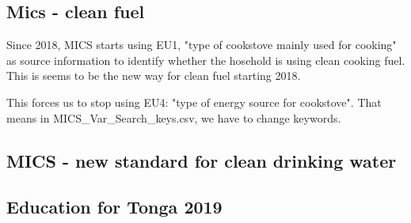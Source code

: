 \documentclass[12pt]{article}
\begin{document}
\subsection{Mics - clean fuel}

Since 2018, MICS starts using EU1, "type of cookstove mainly used for cooking" as source information to identify whether the hosehold is using clean cooking fuel. This is seems to be the new way for clean fuel starting 2018.

This forces us to stop using EU4: "type of energy source for cookstove".
That means in MICS\_Var\_Search\_keys.csv, we have to change keywords.
\subsection{MICS - new standard for clean drinking water}

\subsection{Education for Tonga 2019}
\end{document}
